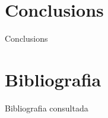 \documentclass[11pt,oneside,a4paper]{article}
\begin{document}
\newpage
\section{Conclusions}
Conclusions

\newpage
\section{Bibliografia}
Bibliografia consultada

\newpage
 

\end{document}

